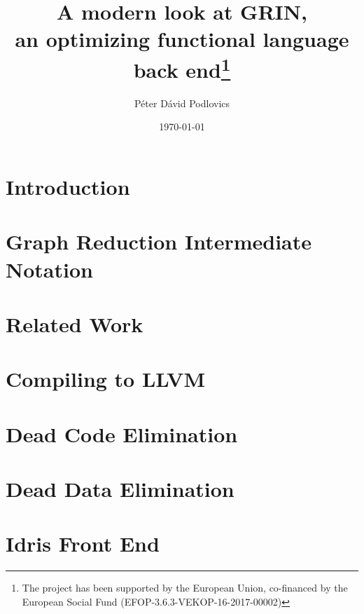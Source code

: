 \documentclass[runningheads,a4paper]{report}
\begin{document}
	
	\title{A modern look at GRIN,\\ an optimizing functional language back end\thanks{ The project has been supported by the European Union, co-financed by the European Social Fund (EFOP-3.6.3-VEKOP-16-2017-00002)}}
	

	\date{\today}
	\author
	{ 
		Péter Dávid Podlovics
	}
	
	\maketitle
	
	\tableofcontents
	
	\chapter{Introduction} \label{sec:intro}
	
	
	\chapter{Graph Reduction Intermediate Notation}
	
	
	
	\chapter{Related Work}
	
	
	\chapter{Compiling to LLVM}
	
	
	\chapter{Dead Code Elimination}
	
	
	
	\chapter{Dead Data Elimination} \label{sec:dde}
	
	
	\chapter{Idris Front End} \label{sec:idris-front-end}
	
	
\end{document}
